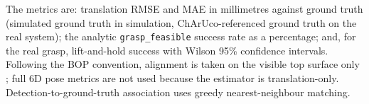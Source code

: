 The metrics are: translation RMSE and MAE in millimetres against ground truth (simulated
ground truth in simulation, ChArUco-referenced ground truth on the real system); the
analytic \texttt{grasp\_feasible} success rate as a percentage; and, for the real grasp,
lift-and-hold success with Wilson 95\% confidence intervals. Following the BOP convention,
alignment is taken on the visible top surface only \cite{hodan2018bop}; full 6D pose
metrics are not used because the estimator is translation-only. Detection-to-ground-truth
association uses greedy nearest-neighbour matching.

